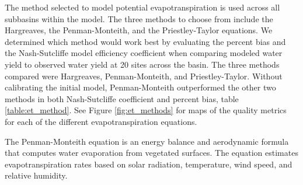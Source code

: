 The method selected to model potential evapotranspiration is used across all subbasins within the model.  The three methods to choose from include the Hargreaves, the Penman-Monteith, and the Priestley-Taylor equations.  We determined which method would work best by evaluating the percent bias and the Nash-Sutcliffe model efficiency coefficient  when comparing modeled water yield to observed water yield at 20 sites across the basin. The three methods compared were Hargreaves, Penman-Monteith, and Priestley-Taylor. Without calibrating the initial model, Penman-Monteith outperformed the other two methods in both Nash-Sutcliffe coefficient and percent bias, table \ref{table:et_method}. See Figure \ref{fig:et_methods} for maps of the quality metrics for each of the different evapotranspiration equations.

The Penman-Monteith equation is an energy balance and aerodynamic formula that computes water evaporation from vegetated surfaces.  The equation estimates evapotranspiration rates based on solar radiation, temperature, wind speed, and relative humidity.


